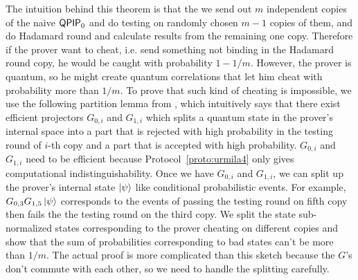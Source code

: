 The intuition behind this theorem is that the we send out $m$ independent copies of the naive $\operatorname{\mathsf{QPIP}}_0$ and do testing on randomly chosen $m-1$ copies of them, and do Hadamard round and calculate results from the remaining one copy. Therefore if the prover want to cheat, i.e. send something not binding in the Hadamard round copy, he would be caught with probability $1-1/m$. However, the prover is quantum, so he might create quantum correlations that let him cheat with probability more than $1/m$. To prove that such kind of cheating is impossible, we use the following partition lemma from \cite{parallelrep}, which intuitively says that there exist efficient projectors $G_{0,i}$ and $G_{1,i}$ which splits a quantum state in the prover's   internal space into a part that is rejected with high probability in the testing round of $i$-th copy and a part that is accepted with high probability.  $G_{0,i}$ and $G_{1,i}$ need to be efficient because Protocol~\ref{proto:urmila4} only gives computational indistinguishability. Once we have $G_{0,i}$ and $G_{1,i}$, we can split up the prover's internal state $\ket{\psi}$ like conditional probabilistic events. For example, $G_{0,3} G_{1,5} \ket{\psi}$ corresponds to the events of passing the testing round on fifth copy then fails the the testing round on the third copy. We split the state sub-normalized states corresponding to the prover cheating on different copies and show that the sum of probabilities corresponding to bad states can't be more than $1/m$. {The actual proof is more complicated than this sketch because the $G$'s don't commute with each other, so we need to handle the splitting carefully.}


